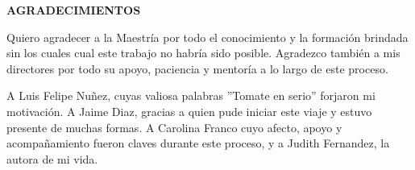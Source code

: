\begin{center}
{\large{\bf{AGRADECIMIENTOS}}}
\end{center}


\noindent
 Quiero agradecer a la Maestría por todo el conocimiento y la formación brindada sin los cuales cual este trabajo no habría sido posible. Agradezco también a mis directores por todo su apoyo, paciencia y mentoría a lo largo de este proceso.
 
 A Luis Felipe Nuñez, cuyas valiosa palabras  ''Tomate en serio'' forjaron mi motivación. A Jaime Diaz, gracias a quien pude iniciar este viaje y estuvo presente de muchas formas. A Carolina Franco cuyo afecto, apoyo y acompañamiento fueron claves durante este proceso, y a Judith Fernandez, la autora de mi vida.
 


\vspace{4cm} %



\clearpage